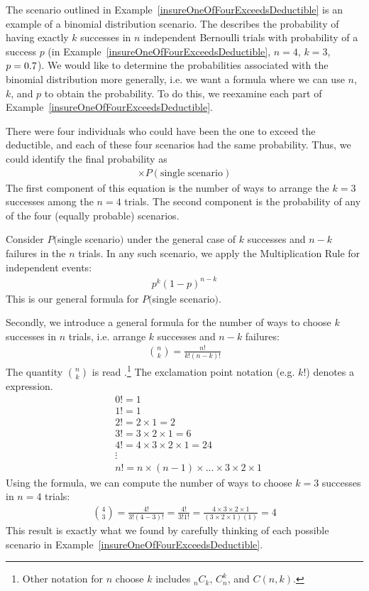 The scenario outlined in Example~\ref{insureOneOfFourExceedsDeductible} is an
example of a binomial distribution scenario.
The 
describes the probability of having exactly $k$ successes
in $n$ independent Bernoulli trials with probability
of a success $p$
(in Example~\ref{insureOneOfFourExceedsDeductible},
$n=4$, $k=3$, $p=0.7{}$).
We would like to determine the probabilities associated
with the binomial distribution more generally,
i.e. we want a formula where we can use $n$, $k$, and $p$
to obtain the probability.
To do this, we reexamine each part of
Example~\ref{insureOneOfFourExceedsDeductible}.

There were four individuals who could have been the one
to exceed the deductible, and each of these four scenarios
had the same probability.
Thus, we could identify the final probability as
\begin{align*}
[\text{\# of scenarios}] \times P(\text{single scenario})
\end{align*}
The first component of this equation is the number of ways
to arrange the $k=3$ successes among the $n=4$ trials.
The second component is the probability of any of the four
(equally probable) scenarios.

Consider $P($single scenario$)$ under the general case of
$k$ successes and $n-k$ failures in the $n$ trials.
In any such scenario, we apply the Multiplication Rule
for independent events:
\begin{align*}
p^k (1 - p)^{n - k}
\end{align*}
This is our general formula for $P($single scenario$)$.

Secondly, we introduce a general formula for the number
of ways to choose $k$ successes in $n$ trials,
i.e. arrange $k$ successes and $n - k$ failures:
\begin{align*}
{n\choose k} = \frac{n!}{k! (n - k)!}
\end{align*}
The quantity ${n\choose k}$ is read
.\footnote{Other notation for
  $n$ choose $k$ includes $_nC_k$, $C_n^k$, and $C(n,k)$.}
The exclamation point notation (e.g. $k!$) denotes
a  expression.
\begin{align*}
& 0! = 1 \\
& 1! = 1 \\
& 2! = 2\times1 = 2 \\
& 3! = 3\times2\times1 = 6 \\
& 4! = 4\times3\times2\times1 = 24 \\
& \vdots \\
& n! = n\times(n-1)\times...\times3\times2\times1
\end{align*}
Using the formula, we can compute the number of ways
to choose $k = 3$ successes in $n = 4$ trials:
\begin{align*}
{4 \choose 3} = \frac{4!}{3!(4-3)!}
  = \frac{4!}{3!1!} 
  = \frac{4\times3\times2\times1}{(3\times2\times1) (1)}
  = 4
\end{align*}
This result is exactly what we found by carefully thinking
of each possible scenario in
Example~\ref{insureOneOfFourExceedsDeductible}.

